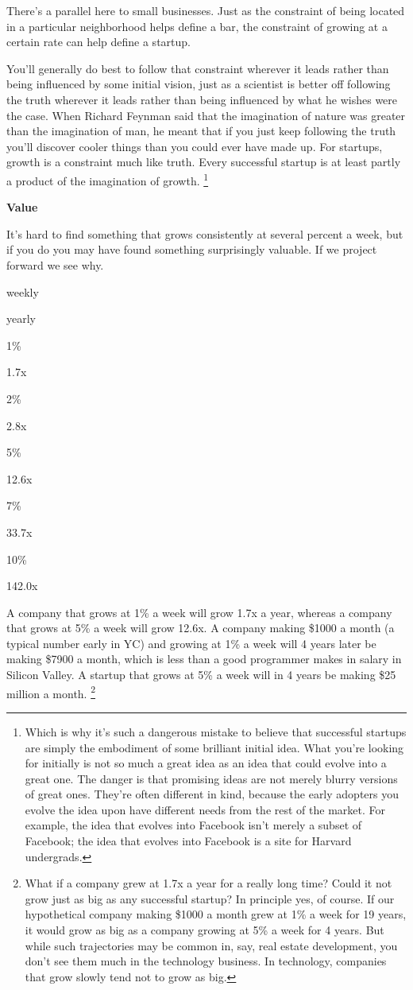 \documentclass[12pt]{book}
\begin{document}
There's a parallel here to small businesses. Just as the constraint of
being located in a particular neighborhood helps define a bar, the
constraint of growing at a certain rate can help define a startup.

You'll generally do best to follow that constraint wherever it leads
rather than being influenced by some initial vision, just as a scientist
is better off following the truth wherever it leads rather than being
influenced by what he wishes were the case. When Richard Feynman said
that the imagination of nature was greater than the imagination of man,
he meant that if you just keep following the truth you'll discover
cooler things than you could ever have made up. For startups, growth is
a constraint much like truth. Every successful startup is at least
partly a product of the imagination of growth. \footnote{Which is why it's such a dangerous mistake to believe that
successful startups are simply the embodiment of some brilliant initial
idea. What you're looking for initially is not so much a great idea as
an idea that could evolve into a great one. The danger is that promising
ideas are not merely blurry versions of great ones. They're often
different in kind, because the early adopters you evolve the idea upon
have different needs from the rest of the market. For example, the idea
that evolves into Facebook isn't merely a subset of Facebook; the idea
that evolves into Facebook is a site for Harvard undergrads.}

\textbf{Value}

It's hard to find something that grows consistently at several percent a
week, but if you do you may have found something surprisingly valuable.
If we project forward we see why.

weekly

yearly

1\%

1.7x

2\%

2.8x

5\%

12.6x

7\%

33.7x

10\%

142.0x

A company that grows at 1\% a week will grow 1.7x a year, whereas a
company that grows at 5\% a week will grow 12.6x. A company making
\$1000 a month (a typical number early in YC) and growing at 1\% a week
will 4 years later be making \$7900 a month, which is less than a good
programmer makes in salary in Silicon Valley. A startup that grows at
5\% a week will in 4 years be making \$25 million a month.
\footnote{What if a company grew at 1.7x a year for a really long time?
Could it not grow just as big as any successful startup? In principle
yes, of course. If our hypothetical company making \$1000 a month grew
at 1\% a week for 19 years, it would grow as big as a company growing at
5\% a week for 4 years. But while such trajectories may be common in,
say, real estate development, you don't see them much in the technology
business. In technology, companies that grow slowly tend not to grow as
big.}
\end{document}

